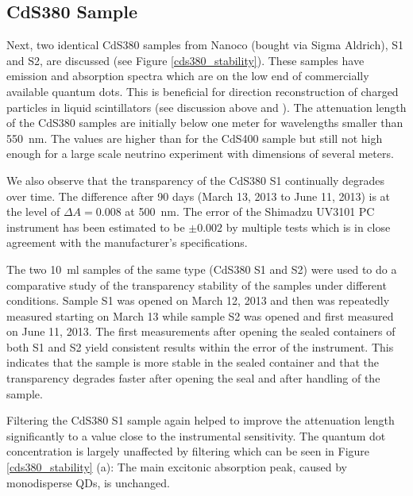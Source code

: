 \documentclass[cits]{JINST}
\begin{document}
\subsection{CdS380 Sample}
Next, two identical CdS380 samples from Nanoco (bought via Sigma Aldrich), S1 and S2, are discussed (see Figure \ref{cds380_stability}). These samples have emission and absorption spectra which are on the low end of commercially available quantum dots. This is beneficial for direction reconstruction of charged particles in liquid scintillators (see discussion above and \cite{mitpaper,simpaper}). The attenuation length of the CdS380 samples are initially below one meter for wavelengths smaller than 550~nm. The values are higher than for the CdS400 sample but still not high enough for a large scale neutrino experiment with dimensions of several meters. 

We also observe that the transparency of the CdS380 S1 continually degrades over time. The difference after 90 days (March 13, 2013 to June 11, 2013) is at the level of $\Delta A = 0.008$ at 500~nm. The error of the Shimadzu UV3101 PC instrument has been estimated to be $\pm 0.002$ by multiple tests which is in close agreement with the manufacturer's specifications. 
 
The two 10~ml samples of the same type (CdS380 S1 and S2) were used to do a comparative study of the transparency stability of the samples under different conditions. Sample S1 was opened on March 12, 2013 and then was repeatedly measured starting on March 13 while sample S2 was opened and first measured on June 11, 2013. The first measurements after opening the sealed containers of both S1 and S2 yield consistent results within the error of the instrument. This indicates that the sample is more stable in the sealed container and that the transparency degrades faster after opening the seal and after handling of the sample.    

Filtering the CdS380 S1 sample again helped to improve the attenuation length significantly to a value close to the instrumental sensitivity. The quantum dot concentration is largely unaffected by filtering which can be seen in Figure \ref{cds380_stability} (a): The main excitonic absorption peak, caused by monodisperse QDs, is unchanged.  
\end{document}
